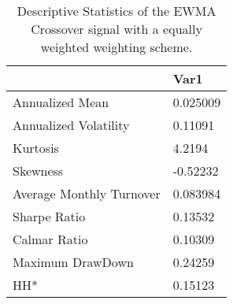\begin{table}[H]
\centering
\begin{tabular}{ll}
& Var1 \\ 
\hline 
Annualized Mean & 0.025009 \\ 
Annualized Volatility & 0.11091 \\ 
Kurtosis & 4.2194 \\ 
Skewness & -0.52232 \\ 
Average Monthly Turnover & 0.083984 \\ 
Sharpe Ratio & 0.13532 \\ 
Calmar Ratio & 0.10309 \\ 
Maximum DrawDown & 0.24259 \\ 
HH* & 0.15123 \\ 
\hline
\end{tabular}
\caption{Descriptive Statistics of the EWMA Crossover signal with a equally weighted weighting scheme.}
\label{MBBSEW}
\end{table}